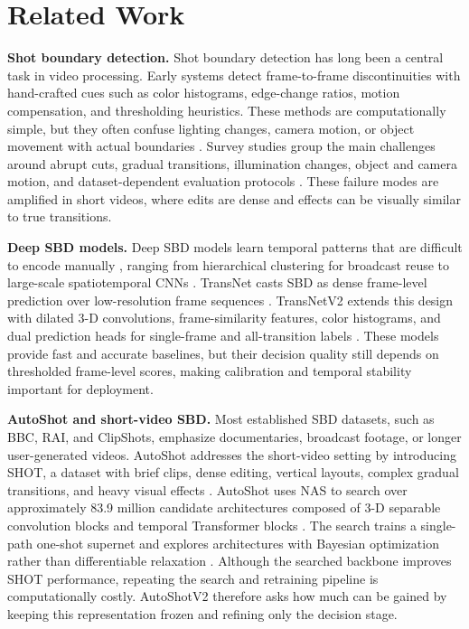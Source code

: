 \section{Related Work}

\textbf{Shot boundary detection.} Shot boundary detection has long been a
central task in video processing. Early systems detect frame-to-frame
discontinuities with hand-crafted cues such as color histograms,
edge-change ratios, motion compensation, and thresholding heuristics. These
methods are computationally simple, but they often confuse lighting changes,
camera motion, or object movement with actual boundaries
\cite{abdulhussain2018review}. Survey studies group the main challenges
around abrupt cuts, gradual transitions, illumination changes, object and
camera motion, and dataset-dependent evaluation protocols
\cite{seridi2020survey,kar2024review}. These failure modes are amplified in
short videos, where edits are dense and effects can be visually similar to
true transitions.

\textbf{Deep SBD models.} Deep SBD models learn temporal patterns that are
difficult to encode manually \cite{tran2015c3d,esteve2023shot}, ranging
from hierarchical clustering for broadcast reuse \cite{baraldi2015shot} to
large-scale spatiotemporal CNNs \cite{hassanien2017deepsbd}. TransNet
casts SBD as dense frame-level prediction over low-resolution frame
sequences \cite{soucek2019transnet}. TransNetV2 extends this design with
dilated 3-D convolutions, frame-similarity features, color histograms, and
dual prediction heads for single-frame and all-transition labels
\cite{soucek2020transnetv2}. These models provide fast and accurate
baselines, but their decision quality still depends on thresholded
frame-level scores, making calibration and temporal stability important for
deployment.

\textbf{AutoShot and short-video SBD.} Most established SBD datasets, such
as BBC, RAI, and ClipShots, emphasize documentaries, broadcast footage, or
longer user-generated videos. AutoShot addresses the short-video setting by
introducing SHOT, a dataset with brief clips, dense editing, vertical
layouts, complex gradual transitions, and heavy visual effects
\cite{zhu2023autoshot}. AutoShot uses NAS
\cite{white2023_nas1000,ren2020_nas_survey,elsken2019nas} to search over
approximately 83.9 million candidate architectures composed of 3-D
separable convolution blocks and temporal Transformer blocks
\cite{vaswani2017attention}. The search trains a single-path one-shot
supernet \cite{guo2020spos} and explores architectures with Bayesian
optimization rather than differentiable relaxation \cite{liu2019darts}.
Although the searched backbone improves SHOT performance, repeating the
search and retraining pipeline is computationally costly. AutoShotV2
therefore asks how much can be gained by keeping this representation frozen
and refining only the decision stage.

